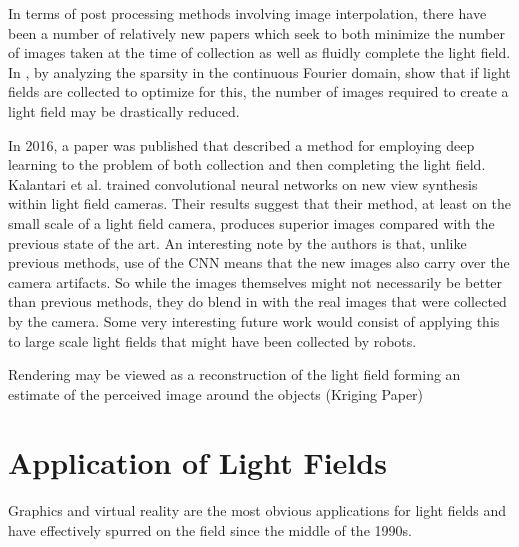 \documentclass[12pt]{report}
\begin{document}
In terms of post processing methods involving image interpolation, there have been a number of relatively new papers which seek to both minimize the number of images taken at the time of collection as well as fluidly complete the light field. In \cite{Shi14}, by analyzing the sparsity in the continuous Fourier domain, show that if light fields are collected to optimize for this, the number of images required to create a light field may be drastically reduced.

In 2016, a paper was published that described a method for employing deep learning to the problem of both collection and then completing the light field. Kalantari et al. trained convolutional neural networks on new view synthesis within light field cameras. Their results suggest that their method, at least on the small scale of a light field camera, produces superior images compared with the previous state of the art. An interesting note by the authors is that, unlike previous methods, use of the CNN means that the new images also carry over the camera artifacts. So while the images themselves might not necessarily be better than previous methods, they do blend in with the real images that were collected by the camera\cite{Kalantari16}. Some very interesting future work would consist of applying this to large scale light fields that might have been collected by robots.

Rendering may be viewed as a reconstruction
of the light field forming an estimate of the
perceived image around the objects
(Kriging Paper)

\section{Application of Light Fields}
Graphics and virtual reality are the most obvious applications for light fields and have effectively spurred on the field since the middle of the 1990s.
\end{document}
